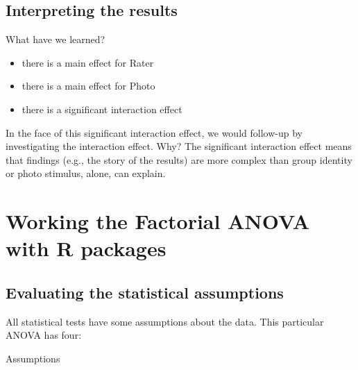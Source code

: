 \documentclass[
  11pt,
]{book}
\providecommand{\tightlist}{%
  \setlength{\itemsep}{0pt}\setlength{\parskip}{0pt}}
\begin{document}
\hypertarget{interpreting-the-results}{%
\subsection{Interpreting the results}\label{interpreting-the-results}}

What have we learned?

\begin{itemize}
\tightlist
\item
  there is a main effect for Rater
\item
  there is a main effect for Photo
\item
  there is a significant interaction effect
\end{itemize}

In the face of this significant interaction effect, we would follow-up by investigating the interaction effect. Why? The significant interaction effect means that findings (e.g., the story of the results) are more complex than group identity or photo stimulus, alone, can explain.

\hypertarget{working-the-factorial-anova-with-r-packages}{%
\section{Working the Factorial ANOVA with R packages}\label{working-the-factorial-anova-with-r-packages}}

\hypertarget{evaluating-the-statistical-assumptions-1}{%
\subsection{Evaluating the statistical assumptions}\label{evaluating-the-statistical-assumptions-1}}

All statistical tests have some assumptions about the data. This particular ANOVA has four:

Assumptions
\end{document}
